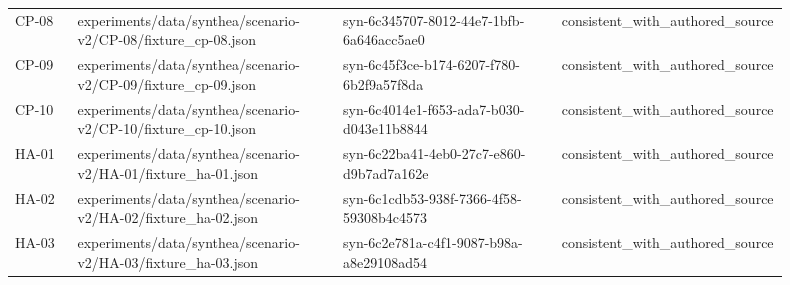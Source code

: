 {\begin{longtable}{p{0.08\linewidth}p{0.34\linewidth}p{0.28\linewidth}p{0.2\linewidth}}
CP-\allowbreak{}08 & experiments/\allowbreak{}data/\allowbreak{}synthea/\allowbreak{}scenario-\allowbreak{}v2/\allowbreak{}CP-\allowbreak{}08/\allowbreak{}fixture\_\allowbreak{}cp-\allowbreak{}08.\allowbreak{}json & syn-\allowbreak{}6c345707-\allowbreak{}8012-\allowbreak{}44e7-\allowbreak{}1bfb-\allowbreak{}6a646acc5ae0 & consistent\_\allowbreak{}with\_\allowbreak{}authored\_\allowbreak{}source \\
CP-\allowbreak{}09 & experiments/\allowbreak{}data/\allowbreak{}synthea/\allowbreak{}scenario-\allowbreak{}v2/\allowbreak{}CP-\allowbreak{}09/\allowbreak{}fixture\_\allowbreak{}cp-\allowbreak{}09.\allowbreak{}json & syn-\allowbreak{}6c45f3ce-\allowbreak{}b174-\allowbreak{}6207-\allowbreak{}f780-\allowbreak{}6b2f9a57f8da & consistent\_\allowbreak{}with\_\allowbreak{}authored\_\allowbreak{}source \\
CP-\allowbreak{}10 & experiments/\allowbreak{}data/\allowbreak{}synthea/\allowbreak{}scenario-\allowbreak{}v2/\allowbreak{}CP-\allowbreak{}10/\allowbreak{}fixture\_\allowbreak{}cp-\allowbreak{}10.\allowbreak{}json & syn-\allowbreak{}6c4014e1-\allowbreak{}f653-\allowbreak{}ada7-\allowbreak{}b030-\allowbreak{}d043e11b8844 & consistent\_\allowbreak{}with\_\allowbreak{}authored\_\allowbreak{}source \\
HA-\allowbreak{}01 & experiments/\allowbreak{}data/\allowbreak{}synthea/\allowbreak{}scenario-\allowbreak{}v2/\allowbreak{}HA-\allowbreak{}01/\allowbreak{}fixture\_\allowbreak{}ha-\allowbreak{}01.\allowbreak{}json & syn-\allowbreak{}6c22ba41-\allowbreak{}4eb0-\allowbreak{}27c7-\allowbreak{}e860-\allowbreak{}d9b7ad7a162e & consistent\_\allowbreak{}with\_\allowbreak{}authored\_\allowbreak{}source \\
HA-\allowbreak{}02 & experiments/\allowbreak{}data/\allowbreak{}synthea/\allowbreak{}scenario-\allowbreak{}v2/\allowbreak{}HA-\allowbreak{}02/\allowbreak{}fixture\_\allowbreak{}ha-\allowbreak{}02.\allowbreak{}json & syn-\allowbreak{}6c1cdb53-\allowbreak{}938f-\allowbreak{}7366-\allowbreak{}4f58-\allowbreak{}59308b4c4573 & consistent\_\allowbreak{}with\_\allowbreak{}authored\_\allowbreak{}source \\
HA-\allowbreak{}03 & experiments/\allowbreak{}data/\allowbreak{}synthea/\allowbreak{}scenario-\allowbreak{}v2/\allowbreak{}HA-\allowbreak{}03/\allowbreak{}fixture\_\allowbreak{}ha-\allowbreak{}03.\allowbreak{}json & syn-\allowbreak{}6c2e781a-\allowbreak{}c4f1-\allowbreak{}9087-\allowbreak{}b98a-\allowbreak{}a8e29108ad54 & consistent\_\allowbreak{}with\_\allowbreak{}authored\_\allowbreak{}source \\

\end{longtable}}
